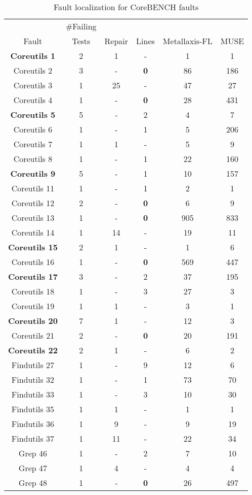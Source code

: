 \begin{table}
\caption{Fault localization for CoreBENCH faults}
\centering
{\scriptsize
\begin{tabular}{|c|c||c|c||c|c|}
\hline
& \#Failing & & & & \\
Fault & Tests & Repair & Lines & Metallaxis-FL & MUSE\\
\hline
{\bf Coreutils 1} & 2 & 1 & - & 1 & 1 \\
Coreutils 2 & 3 & - &  {\bf 0} & 86 & 186 \\
Coreutils 3 & 1 & 25 & - & 47 & 27 \\
Coreutils 4 & 1 & - &  {\bf 0} & 28 & 431 \\
{\bf Coreutils 5} & 5 & - &  2 & 4 & 7 \\
Coreutils 6 & 1 & - &  1 & 5 & 206 \\
Coreutils 7 & 1 & 1 & - & 5 & 9 \\
Coreutils 8 & 1 & - &  1 & 22 & 160 \\
{\bf Coreutils 9} & 5 & - &  1 & 10 & 157 \\
Coreutils 11 & 1 & - &  1 & 2 & 1 \\
Coreutils 12 & 2 & - & {\bf 0} & 6 & 9 \\
Coreutils 13 & 1 & - & {\bf 0} & 905 & 833 \\
Coreutils 14 & 1 & 14 & - & 19 & 11 \\
{\bf Coreutils 15} & 2 & 1 & - & 1 & 6 \\
Coreutils 16 & 1 & - & {\bf 0} & 569 & 447 \\
{\bf Coreutils 17} & 3 & - &  2 & 37 & 195 \\
Coreutils 18 & 1 & - &  3 & 27 & 3 \\
Coreutils 19 & 1 & 1 & - & 3 & 1 \\
{\bf Coreutils 20} & 7 & 1 & - & 12 & 3 \\
Coreutils 21 & 2 & - & {\bf 0} & 20 & 191 \\
{\bf Coreutils 22} & 2 & 1 & - & 6 & 2 \\
Findutils 27 & 1 & - &  9 & 12 & 6 \\
Findutils 32 & 1 & - &  1 & 73 & 70 \\
Findutils 33 & 1 & - &  3 & 10 & 30 \\
Findutils 35 & 1 & 1 & - & 1 & 1 \\
Findutils 36 & 1 & 9 & - & 9 & 19 \\
Findutils 37 & 1 & 11 & - & 22 & 34 \\
Grep 46 & 1 & - &  2 & 7 & 10 \\
Grep 47 & 1 & 4 & - & 4 & 4 \\
Grep 48 & 1 & - & {\bf 0} & 26 & 497 \\

\hline
\end{tabular}
}
\label{otherbugs}
\end{table}
